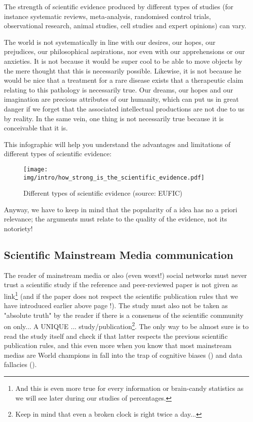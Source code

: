 	The strength of scientific evidence produced by different types of studies (for instance systematic reviews, meta-analysis, randomised control trials, observational research, animal studies, cell studies and expert opinions) can vary.  
	
	\begin{tcolorbox}[title=Remark,colframe=black,arc=10pt]
	The world is not systematically in line with our desires, our hopes, our prejudices, our philosophical aspirations, nor even with our apprehensions or our anxieties. It is not because it would be super cool to be able to move objects by the mere thought that this is necessarily possible. Likewise, it is not because he would be nice that a treatment for a rare disease exists that a therapeutic claim relating to this pathology is necessarily true. Our dreams, our hopes and our imagination are precious attributes of our humanity, which can put us in great danger if we forget that the associated intellectual productions are not due to us by reality. In the same vein, one thing is not necessarily true because it is conceivable that it is.
	\end{tcolorbox}
	
	This infographic will help you understand the advantages and limitations of different types of scientific evidence:
	\begin{figure}[H]
		\centering
		\texttt{[image: img/intro/how\_strong\_is\_the\_scientific\_evidence.pdf]}
		\caption[Different types of scientific evidence]{Different types of scientific evidence (source: EUFIC)}
	\end{figure}
	Anyway, we have to keep in mind that the popularity of a idea has no a priori relevance; the arguments must relate to the quality of the evidence, not its notoriety!
	

	\pagebreak
	\subsection{Scientific Mainstream Media communication}\label{scientific mainstream media communication}
	The reader of mainstream media or also (even worst!) social networks must never trust a scientific study if the reference and peer-reviewed paper is not given as link\footnote{And this is even more true for every information or brain-candy statistics as we will see later during our studies of percentages.} (and if the paper does not respect the scientific publication rules that we have introduced earlier above page \pageref{scientific publicatons rules}!). The study must also not be taken as "absolute truth" by the reader if there is a consensus of the scientific community on only... A UNIQUE ... study/publication\footnote{Keep in mind that even a broken clock is right twice a day...}. The only way to be almost sure is to read the study itself and check if that latter respects the previous scientific publication rules, and this even more when you know that most mainstream medias are World champions in fall into the trap of cognitive biases () and data fallacies ().
	
